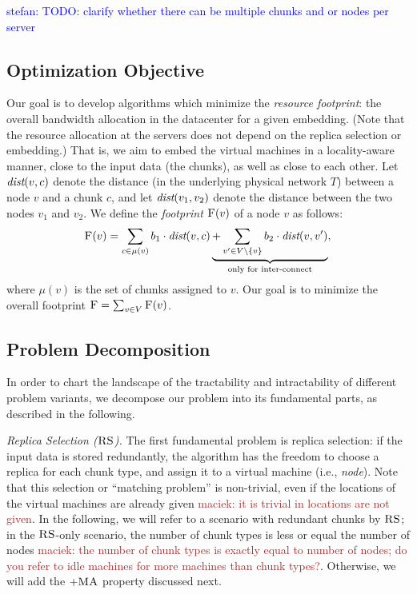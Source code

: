 \documentclass[9pt]{sigcomm-alternate}
\newcommand{\maciek}[1]{\textcolor{brown}{maciek: #1}}
\newcommand{\stefan}[1]{\textcolor{blue}{stefan: #1}}
\newcommand{\VirtualNodes}{\ensuremath{V}}
\newcommand{\achunk}{\ensuremath{c}}
\newcommand{\dist}{\emph{dist}}
\newcommand{\RS}{\textsc{RS}}
\newcommand{\MA}{\textsc{MA}}
\newcommand{\Cost}{\textsc{F}}
\newcommand{\Tree}{\ensuremath{T}}
\newcommand{\CostTrans}{\ensuremath{b_1}}
\newcommand{\CostCom}{\ensuremath{b_2}}
\begin{document}
\stefan{TODO: clarify whether there can be multiple chunks and or nodes per server}


\subsection{Optimization Objective}

Our goal is to develop algorithms which minimize
the \emph{resource footprint}: the overall bandwidth allocation in the datacenter for a given embedding. (Note that
the resource allocation at the servers does not depend on the replica selection or embedding.) That is,
we aim to embed the virtual machines in a locality-aware manner, close to the input data
(the chunks), as well as close to
each other. Let $\dist(v,\achunk)$ denote the distance (in the underlying physical network $\Tree$) between a node $v$ and a
chunk $\achunk$, and let $\dist(v_1,v_2)$ denote the distance between the two nodes $v_1$ and $v_2$.
We define the \emph{footprint} $\Cost(v)$ of a node $v$ as follows:
$$
\Cost(v) = \sum_{\achunk\in \mu(v)} \CostTrans \cdot \dist(v,\achunk) \underbrace{+ \sum_{v' \in \VirtualNodes\setminus\{v\}} \CostCom \cdot \dist(v,v')}_{\text{only for inter-connect}},
$$
\noindent where $\mu(v)$ is the set of chunks assigned to $v$. Our goal is to minimize the overall footprint
$\Cost=\sum_{v\in V} \Cost(v)$.


\subsection{Problem Decomposition}

In order to chart the landscape of the tractability and intractability of different
problem variants, we decompose our problem into its fundamental parts, as described in the following.

\emph{Replica Selection ($\RS$).} The first fundamental problem is replica selection:
if the input data is stored redundantly, the algorithm has the freedom to choose a replica
for each chunk type, and assign it to a virtual machine (i.e., \emph{node}). Note that this
selection or ``matching problem'' is non-trivial, even if the locations of the virtual machines
are already given \maciek{it is trivial in locations are not given}. In the following, we will refer to a scenario
with redundant chunks by $\RS$; in the $\RS$-only scenario, the number of chunk types
is less or equal the number of nodes \maciek{the number of chunk types
  is exactly equal to number of nodes; do you refer to idle machines
  for more machines than chunk types?}. Otherwise, we will add the $+\MA$ property discussed next.
\end{document}
